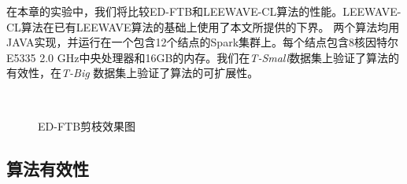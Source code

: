 在本章的实验中，我们将比较ED-FTB和LEEWAVE-CL算法的性能。LEEWAVE-CL算法在已有LEEWAVE算法的基础上使用了本文所提供的下界。
两个算法均用JAVA实现，并运行在一个包含12个结点的Spark集群上。每个结点包含8核因特尔E5335 2.0 GHz中央处理器和16GB的内存。我们在\emph{T-Small}数据集上验证了算法的有效性，在\emph{T-Big} 数据集上验证了算法的可扩展性。
\begin{figure}[t]
	\centering
	\centering
	\\
	\caption{ED-FTB剪枝效果图}
	\label{fig:ED-DTKTS}
\end{figure}

\subsection{算法有效性}


